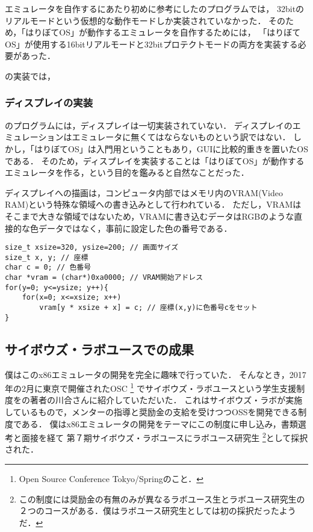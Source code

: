 \documentclass[10pt,a4j]{jsarticle}
\begin{document}
エミュレータを自作するにあたり初めに参考にした\cite{learn-x86-by-emu}のプログラムでは，
32bitのリアルモードという仮想的な動作モードしか実装されていなかった．
そのため，「はりぼてOS」が動作するエミュレータを自作するためには，
「はりぼてOS」が使用する16bitリアルモードと32bitプロテクトモードの両方を実装する必要があった．

\cite{learn-x86-by-emu}の実装では，

\subsubsection{ディスプレイの実装}
\cite{learn-x86-by-emu}のプログラムには，ディスプレイは一切実装されていない．
ディスプレイのエミュレーションはエミュレータに無くてはならないものという訳ではない．
しかし，「はりぼてOS」は入門用ということもあり，GUIに比較的重きを置いたOSである．
そのため，ディスプレイを実装することは「はりぼてOS」が動作するエミュレータを作る，という目的を鑑みると自然なことだった．

ディスプレイへの描画は，コンピュータ内部ではメモリ内のVRAM(Video RAM)という特殊な領域への書き込みとして行われている．
ただし，VRAMはそこまで大きな領域ではないため，VRAMに書き込むデータはRGBのような直接的な色データではなく，事前に設定した色の番号である．

\begin{lstlisting}
size_t xsize=320, ysize=200; // 画面サイズ
size_t x, y; // 座標
char c = 0; // 色番号
char *vram = (char*)0xa0000; // VRAM開始アドレス
for(y=0; y<=ysize; y++){
	for(x=0; x<=xsize; x++)
		vram[y * xsize + x] = c; // 座標(x,y)に色番号cをセット
}
\end{lstlisting}


\subsection{サイボウズ・ラボユースでの成果}

僕はこのx86エミュレータの開発を完全に趣味で行っていた．
そんなとき，2017年の2月に東京で開催されたOSC
\footnote{Open Source Conference Tokyo/Springのこと．}
でサイボウズ・ラボユースという学生支援制度を\cite{30days-osdev}の著者の川合さんに紹介していただいた．
これはサイボウズ・ラボが実施しているもので，メンターの指導と奨励金の支給を受けつつOSSを開発できる制度である．
僕はx86エミュレータの開発をテーマにこの制度に申し込み，書類選考と面接を経て
第７期サイボウズ・ラボユースにラボユース研究生
\footnote{この制度には奨励金の有無のみが異なるラボユース生とラボユース研究生の２つのコースがある．僕はラボユース研究生としては初の採択だったようだ．}として採択された．
\end{document}
